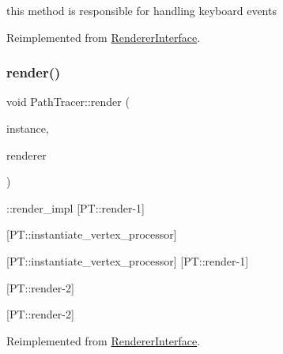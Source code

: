 this method is responsible for handling keyboard events 

Reimplemented from \hyperlink{struct_renderer_interface_a9f5afd3701d8d935a2ecf08fb9f5f604}{Renderer\+Interface}.

\mbox{\label{group___p_t_module_details_ga3e6317495ea6c761968a893b3a54824e}} 
\subsubsection{\texorpdfstring{render()}{render()}}
{\footnotesize\ttfamily void Path\+Tracer\+::render (\begin{DoxyParamCaption}\item[{const uint32}]{instance,  }\item[{\hyperlink{struct_rendering_context}{Rendering\+Context} \&}]{renderer }\end{DoxyParamCaption})\hspace{0.3cm}{\ttfamily [virtual]}}

\label{group___p_t_module_details_PathTracer}%
%
\+::render\+\_\+impl \mbox{[}P\+T\+::render-\/1\mbox{]}

\mbox{[}P\+T\+::instantiate\+\_\+vertex\+\_\+processor\mbox{]}

\mbox{[}P\+T\+::instantiate\+\_\+vertex\+\_\+processor\mbox{]} \mbox{[}P\+T\+::render-\/1\mbox{]}

\mbox{[}P\+T\+::render-\/2\mbox{]}

\mbox{[}P\+T\+::render-\/2\mbox{]} 

Reimplemented from \hyperlink{struct_renderer_interface_aa64254dd44c94929b05092dc8d74f29d}{Renderer\+Interface}.

